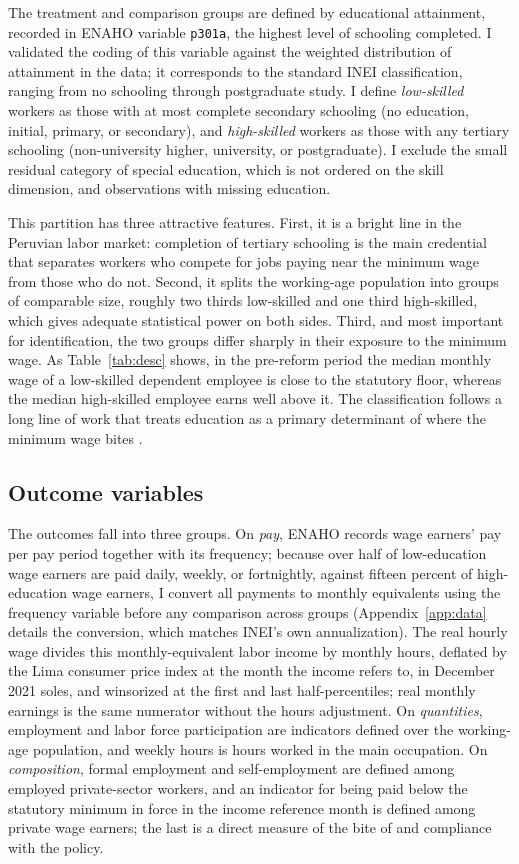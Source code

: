 The treatment and comparison groups are defined by educational attainment, recorded
in ENAHO variable \texttt{p301a}, the highest level of schooling completed. I
validated the coding of this variable against the weighted distribution of attainment
in the data; it corresponds to the standard INEI classification, ranging from no
schooling through postgraduate study. I define \emph{low-skilled} workers as those
with at most complete secondary schooling (no education, initial, primary, or
secondary), and \emph{high-skilled} workers as those with any tertiary schooling
(non-university higher, university, or postgraduate). I exclude the small residual
category of special education, which is not ordered on the skill dimension, and
observations with missing education.

This partition has three attractive features. First, it is a bright line in the
Peruvian labor market: completion of tertiary schooling is the main credential that
separates workers who compete for jobs paying near the minimum wage from those who do
not. Second, it splits the working-age population into groups of comparable size,
roughly two thirds low-skilled and one third high-skilled, which gives adequate
statistical power on both sides. Third, and most important for identification, the two
groups differ sharply in their exposure to the minimum wage. As
Table~\ref{tab:desc} shows, in the pre-reform period the median monthly wage of a
low-skilled dependent employee is close to the statutory floor, whereas the median
high-skilled employee earns well above it. The classification follows a long line of
work that treats education as a primary determinant of where the minimum wage bites
\citep{lemos_2009, katzkowicz_2021_uruguay}.

\subsection{Outcome variables}

The outcomes fall into three groups. On \emph{pay}, ENAHO records wage earners' pay per
pay period together with its frequency; because over half of low-education wage earners
are paid daily, weekly, or fortnightly, against fifteen percent of high-education wage
earners, I convert all payments to monthly equivalents using the frequency variable
before any comparison across groups (Appendix~\ref{app:data} details the conversion,
which matches INEI's own annualization). The real hourly wage divides this
monthly-equivalent labor income by monthly hours, deflated by the Lima consumer price
index at the month the income refers to, in December 2021 soles, and winsorized at the
first and last half-percentiles; real monthly earnings is the same numerator without the
hours adjustment. On \emph{quantities}, employment and labor force participation are
indicators defined over the working-age population, and weekly hours is hours worked in
the main occupation. On \emph{composition}, formal employment and self-employment are
defined among employed private-sector workers, and an indicator for being paid below the
statutory minimum in force in the income reference month is defined among private wage
earners; the last is a direct measure of the bite of and compliance with the policy.

